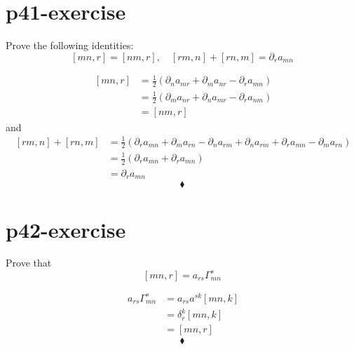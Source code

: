 \section{p41-exercise}
\begin{tcolorbox}
Prove the following identities: $$ [mn,r] = [nm,r], \quad [rm,n]+[rn,m] = \partial_r a_{mn}$$
\end{tcolorbox}
\begin{align}
\ [mn,r] &= \frac{1}{2}(\partial_{n} a_{mr}+ \partial_{m} a_{nr} - \partial_{r} a_{mn})\\
\ &= \frac{1}{2}(\partial_{m} a_{nr} + \partial_{n} a_{mr}  - \partial_{r} a_{nm})\\
\ &=[nm,r] 
\end{align}
and 
\begin{align}
\ [rm,n] + [rn,m]&= \frac{1}{2}(\partial_{r} a_{mn}+ \partial_{m} a_{rn} - \partial_{n} a_{rm} + \partial_{n} a_{rm}+ \partial_{r} a_{mn} - \partial_{m} a_{rn})\\
\ &= \frac{1}{2}(\partial_{r} a_{mn}+\partial_{r} a_{mn})\\
\ &=\partial_{r} a_{mn}
\end{align}
$$\blacklozenge$$
\newpage

\section{p42-exercise}
\begin{tcolorbox}
Prove that  $$ [mn,r] = a_{rs}\Gamma^s_{mn}$$
\end{tcolorbox}
\begin{align}
\ a_{rs}\Gamma^s_{mn} & = a_{rs}a^{sk}[mn,k]\\
\ & = \delta^k_r[mn,k]\\
\ &= [mn,r]
\end{align}
$$\blacklozenge$$
\newpage

